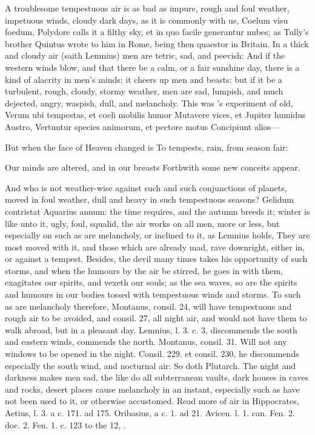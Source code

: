 {{A troublesome tempestuous air is as bad as impure, rough and foul
weather, impetuous winds, cloudy dark days, as it is commonly with us,
Coelum visu foedum, Polydore calls it a filthy sky, et in quo
facile generantur nubes; as Tully's brother Quintus wrote to him in
Rome, being then quaestor in Britain. In a thick and cloudy air (saith
Lemnius) men are tetric, sad, and peevish: And if the western winds
blow, and that there be a calm, or a fair sunshine day, there is a kind
of alacrity in men's minds; it cheers up men and beasts: but if it be a
turbulent, rough, cloudy, stormy weather, men are sad, lumpish, and
much dejected, angry, waspish, dull, and melancholy. This was
\Virgil{}'s experiment of old,
Verum ubi tempestas, et coeli mobilis humor
Mutavere vices, et Jupiter humidus Austro,
Vertuntur species animorum, et pectore motus
Concipiunt alios---


But when the face of Heaven changed is
To tempests, rain, from season fair:

Our minds are altered, and in our breasts
Forthwith some new conceits appear.

And who is not weather-wise against such and such conjunctions of
planets, moved in foul weather, dull and heavy in such tempestuous
seasons?  Gelidum contristat Aquarius annum: the time requires,
and the autumn breeds it; winter is like unto it, ugly, foul, squalid,
the air works on all men, more or less, but especially on such as are
melancholy, or inclined to it, as Lemnius holds, They are most
moved with it, and those which are already mad, rave downright, either
in, or against a tempest. Besides, the devil many times takes his
opportunity of such storms, and when the humours by the air be stirred,
he goes in with them, exagitates our spirits, and vexeth our souls; as
the sea waves, so are the spirits and humours in our bodies tossed with
tempestuous winds and storms. To such as are melancholy therefore,
Montanus, consil. 24, will have tempestuous and rough air to be
avoided, and consil. 27, all night air, and would not have them to walk
abroad, but in a pleasant day. Lemnius, l. 3. c. 3, discommends the
south and eastern winds, commends the north. Montanus, consil. 31.
Will not any windows to be opened in the night. Consil. 229. et
consil. 230, he discommends especially the south wind, and nocturnal
air: So doth Plutarch. The night and darkness makes men sad, the
like do all subterranean vaults, dark houses in caves and rocks, desert
places cause melancholy in an instant, especially such as have not been
used to it, or otherwise accustomed. Read more of air in Hippocrates,
Aetius, l. 3. a c. 171. ad 175. Oribasius, a c. 1. ad 21. Avicen. l. 1.
can. Fen. 2. doc. 2. Fen. 1. c. 123 to the 12, \etc{}.

}}
